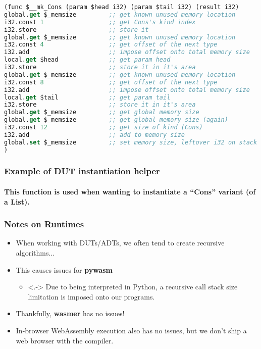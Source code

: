 \documentclass{beamer}
\begin{document}
\begin{lrbox}{\exampleInstantiationHelper}
\begin{lstlisting}[language=Lisp,basicstyle=\tiny]
(func $__mk_Cons (param $head i32) (param $tail i32) (result i32)
global.get $_memsize         ;; get known unused memory location
i32.const 1                  ;; get Cons's kind index
i32.store                    ;; store it
global.get $_memsize         ;; get known unused memory location
i32.const 4                  ;; get offset of the next type
i32.add                      ;; impose offset onto total memory size
local.get $head              ;; get param head
i32.store                    ;; store it in it's area
global.get $_memsize         ;; get known unused memory location
i32.const 8                  ;; get offset of the next type
i32.add                      ;; impose offset onto total memory size
local.get $tail              ;; get param tail
i32.store                    ;; store it in it's area
global.get $_memsize         ;; get global memory size
global.get $_memsize         ;; get global memory size (again)
i32.const 12                 ;; get size of kind (Cons)
i32.add                      ;; add to memory size
global.set $_memsize         ;; set memory size, leftover i32 on stack which is the returned pointer to the generated Cons
)
\end{lstlisting}
\end{lrbox}

\begin{frame}
 \frametitle{Example of DUT instantiation helper}
 \framesubtitle{This function is used when wanting to instantiate a ``Cons'' variant (of a List).}
 \usebox{\exampleInstantiationHelper}
\end{frame}


\begin{frame}
\frametitle{Notes on Runtimes}
\begin{itemize}
    \item<1-> When working with DUTs/ADTs, we often tend to create recursive algorithms...
    \item<2-> This causes issues for \textbf{pywasm}
    \begin{itemize}
     \item <.-> Due to being interpreted in Python, a recursive call stack size limitation is imposed onto our programs.
    \end{itemize}

    \item<3-> Thankfully, \textbf{wasmer} has no issues!
    \item<4-> In-browser WebAssembly execution also has no issues, but we don't ship a web browser with the compiler.
\end{itemize}
\end{frame}
\end{document}
